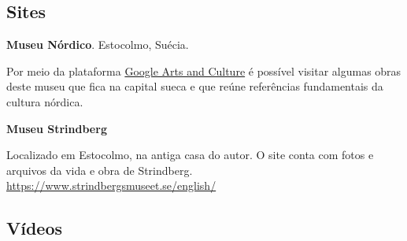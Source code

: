 \documentclass[12pt]{extarticle}
\begin{document}
\subsection{Sites}

\textbf{Museu Nórdico}. Estocolmo, Suécia.

Por meio da plataforma \href{https://artsandculture.google.com/partner/nordiska-museet}{Google Arts and Culture} é possível visitar algumas obras deste 
museu que fica na capital sueca e que reúne referências fundamentais da cultura nórdica.

\textbf{Museu Strindberg} 

Localizado em Estocolmo, na antiga casa do autor. O site conta com fotos e arquivos da vida e obra de Strindberg.
\url{https://www.strindbergsmuseet.se/english/}

\subsection{Vídeos}
\end{document}
